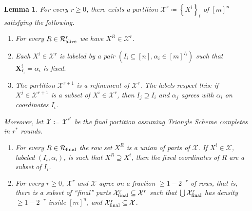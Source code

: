 \documentclass[11pt]{article}
\numberwithin{equation}{section}
\newtheorem{lemma}[theorem]{Lemma}
\theoremstyle{definition}
\theoremstyle{plain}
\newcommand{\trischeme}{\hyperref[alg:tri-partition]{Triangle Scheme}\xspace}
\newcommand{\X}{\bm{X}}
\newcommand{\calR}{\mathcal{R}}
\newcommand{\calX}{\mathcal{X}}
\newcommand{\allX}{[m]^n}
\newcommand{\set}[1]{\left \{ #1 \right \}}
\newcommand{\alive}{\text{\upshape alive}}
\newcommand{\final}{\text{\upshape final}}
\begin{document}
\begin{lemma} \label{lem:invariants}
For every $r\geq 0$, there exists a partition $\calX^r \coloneqq \set{X^i}_i$ of $\allX$ satisfying the following.%
\begin{enumerate}[label={\upshape(P\arabic*)},leftmargin=13mm]
		\item \label{p1} For every $R \in \calR^r_{\alive}$ we have $X^R \in \calX^r$.
		\item \label{p2} Each $X^i \in \calX^r$ is labeled by a pair $(I_i \subseteq [n], \alpha_i \in [m]^{I_i})$ such that $\X^i_{I_i} = \alpha_i$ is fixed.
		\item \label{p3} The partition $\calX^{r+1}$ is a refinement of $\calX^r$. The labels respect this: if $X^j \in \calX^{r+1}$ is a subset of $X^i \in \calX^r$, then $I_j \supseteq I_i$ and $\alpha_j$ agrees with $\alpha_i$ on coordinates $I_i$.
\end{enumerate}
Moreover, let $\calX \coloneqq \calX^{r^*}$ be the final partition assuming \trischeme completes in $r^*$ rounds.
\begin{enumerate}[label={\upshape(P\arabic*)},leftmargin=13mm,resume]
		\item \label{p4} For every $R\in\calR_{\final}$ the row set $X^R$ is a union of parts of $\calX$. If $X^i\in\calX$, labeled $(I_i,\alpha_i)$, is such that $X^R\supseteq X^i$, then the fixed coordinates of $R$ are a subset of $I_i$.
		\item \label{p5}
		For every $r\geq0$, $\calX^r$ and $\calX$ agree on a fraction $\geq 1-2^{-r}$ of rows, that is, there is a subset of ``final'' parts $\calX^r_{\final}\subseteq\calX^r$ such that $\bigcup\calX^r_{\final}$ has density $\geq 1-2^{-r}$ inside $[m]^n$, and $\calX^r_{\final}\subseteq\calX$.
\end{enumerate}
\end{lemma}
\end{document}
